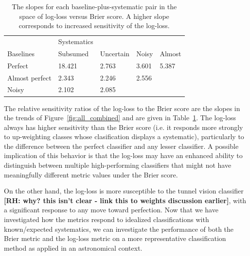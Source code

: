 

\begin{table}[]
\begin{tabular}{l|llll}
	& Systematics & & &\\
Baselines & Subsumed & Uncertain & Noisy & Almost\\
\hline
Perfect & 18.421 & 2.763 & 3.601 & 5.387\\
Almost perfect & 2.343 & 2.246 & 2.556 & \\
Noisy & 2.102 & 2.085 & &
\end{tabular}
\caption{The slopes for each baseline-plus-systematic pair in the space of log-loss versus Brier score.
A higher slope corresponds to increased sensitivity of the log-loss.}
\label{tab:slopes}
\end{table}

The relative sensitivity ratios of the log-loss to the Brier score are the slopes in the trends of Figure~\ref{fig:all_combined} and are given in Table~\ref{tab:slopes}.
The log-loss always has higher sensitivity than the Brier score (i.e. it responds more strongly to up-weighting classes whose clasification displays a systematic), particularly to the difference between the perfect classifier and any lesser classifier.
A possible implication of this behavior is that the log-loss may have an enhanced ability to distinguish between multiple high-performing classifiers that might not have meaningfully different metric values under the Brier score.

On the other hand, the log-loss is more susceptible to the tunnel vision classifier \textbf{[RH: why? this isn't clear - link this to weights discussion earlier]}, with a significant response to any move toward perfection.
Now that we have investigated how the metrics respond to idealized classifications with known/expected systematics, we can investigate the performance of both the Brier metric and the log-loss metric on a more representative classification method as applied in an astronomical context.

